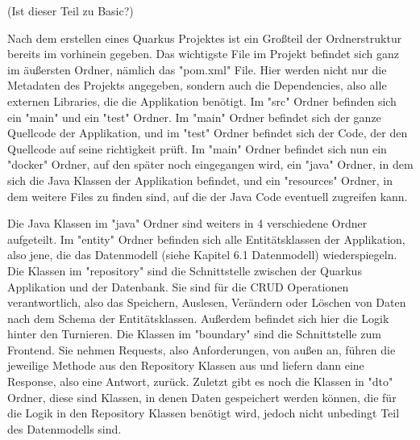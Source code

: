 (Ist dieser Teil zu Basic?)

Nach dem erstellen eines Quarkus Projektes ist ein Großteil der Ordnerstruktur bereits im vorhinein gegeben. Das wichtigste File im Projekt befindet sich ganz im äußersten Ordner, nämlich das "pom.xml" File. Hier werden 
nicht nur die Metadaten des Projekts angegeben, sondern auch die Dependencies, also alle externen Libraries, die die Applikation benötigt. 
Im "src" Ordner befinden sich ein "main" und ein "test" Ordner. Im "main" Ordner befindet sich der ganze Quellcode der Applikation, und im "test" Ordner befindet sich der Code, der den Quellcode auf seine richtigkeit prüft.
Im "main" Ordner befindet sich nun ein "docker" Ordner, auf den später noch eingegangen wird, ein "java" Ordner, in dem sich die Java Klassen der Applikation befindet, und ein "resources" Ordner, in dem weitere Files zu finden sind, 
auf die der Java Code eventuell zugreifen kann.

Die Java Klassen im "java" Ordner sind weiters in 4 verschiedene Ordner aufgeteilt. Im "entity" Ordner befinden sich alle Entitätsklassen der Applikation, also jene, die das Datenmodell (siehe Kapitel 6.1 Datenmodell) wiederspiegeln.
Die Klassen im "repository" sind die Schnittstelle zwischen der Quarkus Applikation und der Datenbank. Sie sind für die CRUD Operationen verantwortlich, also das Speichern, Auslesen, Verändern oder Löschen von Daten nach dem Schema der Entitätsklassen.
Außerdem befindet sich hier die Logik hinter den Turnieren. Die Klassen im "boundary" sind die Schnittstelle zum Frontend. Sie nehmen Requests, also Anforderungen, von außen an, 
führen die jeweilige Methode aus den Repository Klassen aus und liefern dann eine Response, also eine Antwort, zurück. Zuletzt gibt es noch die Klassen in "dto" Ordner, diese sind Klassen, in denen Daten gespeichert werden können, die für die Logik in den 
Repository Klassen benötigt wird, jedoch nicht unbedingt Teil des Datenmodells sind.
 